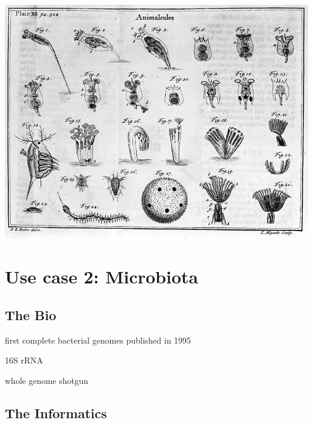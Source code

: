 \begin{center}
\begin{minipage}{5in}
\begin{center}
{\vspace*{2cm}
\includegraphics[scale=2]{chapters/images/mycrobiota/animalcules2.png}

}

\end{center}
\end{minipage}
\end{center}

\newpage


\section{Use case 2: Microbiota}

\subsection{The Bio}
first complete bacterial genomes published in 1995  \cite{land2015insights}

16S rRNA

whole genome shotgun

\subsection{The Informatics}



